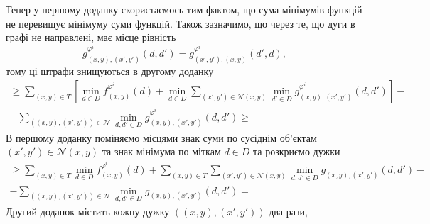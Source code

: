 Тепер у першому доданку скористаємось тим фактом,
що сума мінімумів функцій не перевищує мінімуму суми функцій.
Також зазначимо, що через те, що дуги в графі не направлені,
має місце рівність
\begin{equation*}
    g_{\left(x, y \right), \left(x', y' \right)}^{\varphi^i}
            \left(d, d' \right) =
    g_{\left(x', y' \right), \left(x, y \right)}^{\varphi^i}
            \left(d', d \right),
\end{equation*}
тому ці штрафи знищуються в другому доданку
\begin{equation*}
\begin{gathered}
    \ge \sum \limits_{\left(x, y \right) \in T} \left[
        \min \limits_{d \in D}
            f_{\left(x, y \right)}^{\varphi^i} \left(d \right) +
        \min \limits_{d \in D}
            \sum \limits_{\left(x', y' \right) \in \mathcal{N} \left(x, y \right)}
                \min \limits_{d' \in D}
                    g_{\left(x, y \right), \left(x', y' \right)}^{\varphi^i}
                        \left(d, d' \right)
    \right] - \\
    - \sum \limits_{\left(\left(x, y \right), \left(x', y' \right) \right) \in \mathcal{N}}
        \min \limits_{d, d' \in D}
            g_{\left(x, y \right), \left(x', y' \right)}^{\varphi^i}
                \left(d, d' \right) \ge
\end{gathered}
\end{equation*}
В першому доданку поміняємо місцями знак суми по сусіднім об'єктам
$\left(x', y' \right) \in \mathcal{N} \left(x, y \right)$
та знак мінімума по міткам $d \in D$ та розкриємо дужки
\begin{equation*}
\begin{gathered}
    \ge \sum \limits_{\left(x, y \right) \in T}
        \min \limits_{d \in D}
            f_{\left(x, y \right)}^{\varphi^i} \left( d \right) +
    \sum \limits_{\left(x, y \right) \in T}
        \sum \limits_{\left(x', y' \right) \in \mathcal{N} \left(x, y \right)}
            \min \limits_{d, d' \in D}
                g_{\left(x, y \right), \left(x', y' \right)}
                    \left( d, d' \right) - \\
    - \sum \limits_{\left(\left(x, y \right), \left(x', y' \right) \right) \in \mathcal{N}}
        \min \limits_{d, d' \in D}
            g_{\left(x, y \right), \left(x', y' \right)} \left( d, d' \right) =
\end{gathered}
\end{equation*}
Другий доданок містить кожну дужку
$\left( \left(x, y \right), \left(x', y' \right) \right)$ два рази,
